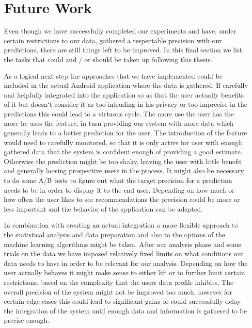 \section{Future Work}
\label{sec:future_work}

Even though we have successfully completed our experiments and have, under certain restrictions to our data, gathered a respectable precision with our predictions, there are still things left to be improved. In this final section we list the tasks that could and / or should be taken up following this thesis.

As a logical next step the approaches that we have implemented could be included in the actual Android application where the data is gathered. If carefully and helpfully integrated into the application so as that the user actually benefits of it but doesn`t consider it as too intruding in his privacy or too imprecise in the predictions this could lead to a virtuous cycle. The more use the user has the more he uses the feature, in turn providing our system with more data which generally leads to a better prediction for the user. The introduction of the feature would need to carefully monitored, so that it is only active for user with enough gathered data that the system is confident enough of providing a good estimate. Otherwise the prediction might be too shaky, leaving the user with little benefit and generally loosing prospective users in the process. It might also be necessary to do some A/B tests to figure out what the target precision for a prediction needs to be in order to display it to the end user. Depending on how much or how often the user likes to see recommendations the precision could be more or less important and the behavior of the application can be adapted.

In combination with creating an actual integration a more flexible approach to the statistical analysis and data preparation and also to the options of the machine learning algorithms might be taken. After our analysis phase and some trials on the data we have imposed relatively fixed limits on what conditions our data needs to have in order to be relevant for our analysis. Depending on how the user actually behaves it might make sense to either lift or to further limit certain restrictions, based on the complexity that the users data profile inhibits. The overall precision of the system might not be improved too much, however for certain edge cases this could lead to significant gains or could successfully delay the integration of the system until enough data and information is gathered to be precise enough. 

